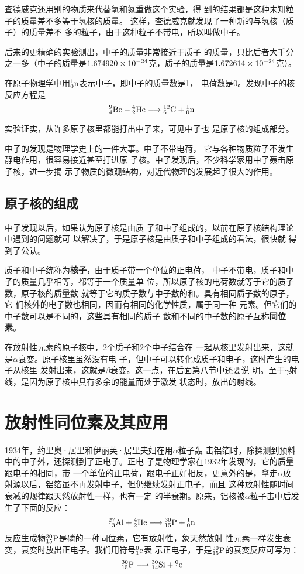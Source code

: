 查德威克还用别的物质来代替氢和氮重做这个实验，得
到的结果都是这种未知粒子的质量差不多等于氢核的质量。
这样，查德威克就发现了一种新的与氢核（质子）的质量差不
多的粒子，由于这种粒子不带电，所以叫做中子。

后来的更精确的实验测出，中子的质量非常接近于质子
的质量，只比后者大千分之一多（中子的质量是$1.674920\x
10^{-24}$克，质子的质量是$1.672614\x10^{-24}$克）。

在原子物理学中用$\atom{n}{1}{0}$表示中子，即中子的质量数是1，
电荷数是0。发现中子的核反应方程是
\[\atom{Be}{9}{4}+\atom{He}{4}{2}\longrightarrow \atom{C}{12}{6}+\atom{n}{1}{0}  \]

实验证实，从许多原子核里都能打出中子来，可见中子也
是原子核的组成部分。

中子的发现是物理学史上的一件大事。中子不带电荷，
它与各种物质粒子不发生静电作用，很容易接近甚至打进原
子核。中子发现后，不少科学家用中子轰击原子核，进一步揭
示了物质的微观结构，对近代物理的发展起了很大的作用。

\subsection{原子核的组成}

中子发现以后，如果认为原子核是由质
子和中子组成的，以前在原子核结构理论中遇到的问题就可
以解决了，于是原子核是由质子和中子组成的看法，很快就
得到了公认。

质子和中子统称为\textbf{核子}，由于质子带一个单位的正电荷，
中子不带电，质子和中子的质量几乎相等，都等于一个质量单
位，所以原子核的电荷数就等于它的质子数，原子核的质量数
就等于它的质子数与中子数的和。具有相同质子数的原子，它
们核外的电子数也相同，因而有相同的化学性质，属于同一种
元素。但它们的中子数可以是不同的，这些具有相同的质子
数和不同的中子数的原子互称\textbf{同位素}。

在放射性元素的原子核中，2个质子和2个中子结合在
一起从核里发射出来，这就是$\alpha$衰变。原子核里虽然没有电
子，但中子可以转化成质子和电子，这时产生的电子从核里
发射出来，这就是$\beta$衰变。这一点，在后面第八节中还要说
明。至于$\gamma$射线，是因为原子核中具有多余的能量而处于激发
状态时，放出的射线。


\section{放射性同位素及其应用}
1934年，约里奥·居里和伊丽芙·居里夫妇在用$\alpha$粒子轰
击铝箔时，除探测到预料中的中子外，还探测到了正电子。正电
子是物理学家在1932年发现的，它的质量跟电子的相同，带
一个单位的正电荷，跟电子正好相反，更意外的是，拿走$\alpha$放
射源以后，铝箔虽不再发射中子，但仍继续发射正电子，而且
这种放射性随时间衰减的规律跟天然放射性一样，也有一定
的半衰期。原来，铝核被$\alpha$粒子击中后发生了下面的反应：
\[\atom{Al}{27}{13}+\atom{He}{4}{2}\longrightarrow\atom{P}{30}{15}+\atom{n}{1}{0}  \]
反应生成物$\atom{P}{30}{15}$是磷的一种同位素，它有放射性，象天然放射
性元素一样发生衰变，衰变时放出正电子。我们用符号$\atom{e}{0}{1}$表
示正电子，于是$\atom{P}{30}{15}$的衰变反应可写为：
\[\atom{P}{30}{15}\longrightarrow \atom{Si}{30}{14}+\atom{e}{0}{1} \]

